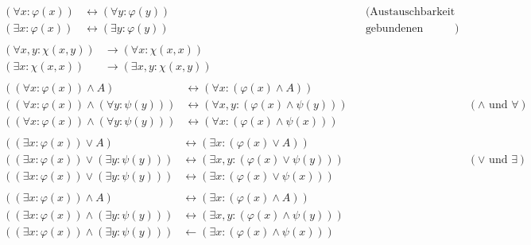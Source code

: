 \documentclass[12pt,BCOR1cm,ngerman,DIV15,fleqn,chapterprefix,headings=small]{ST1-book}
\begin{document}
   \begin{align*}
  \begin{split} (\forall x : \varphi(x)) & \leftrightarrow (\forall y : \varphi(y)) \\
  (\exists x : \varphi(x)) & \leftrightarrow (\exists y : \varphi(y)) \end{split} &  \begin{split}
  (\text{Austauschbarkeit der} \\
  \text{gebundenen Variable})
  \end{split}  \\[1em]
  \begin{split} (\forall x,y : \chi(x,y)) & \to (\forall x : \chi(x,x)) \\
    (\exists x : \chi(x,x)) & \to (\exists x, y: \chi(x,y)) \end{split} \\[1em]
      \begin{split} ((\forall x : \varphi(x)) \land A) & \leftrightarrow (\forall x :(\varphi(x) \land A)) \\
           ((\forall x : \varphi(x)) \land (\forall y : \psi(y))) & \leftrightarrow (\forall x,y : (\varphi(x) \land \psi(y)))\\
     ((\forall x : \varphi(x)) \land (\forall y : \psi(y))) & \leftrightarrow (\forall x : (\varphi(x) \land \psi(x))) 
     \end{split} && (\text{$\land$ und $\forall$}) \\[1em]
              \begin{split}
((\exists x : \varphi(x)) \lor A) & \leftrightarrow (\exists x : (\varphi(x) \lor A)) \\
      ((\exists x : \varphi(x)) \lor (\exists y : \psi(y))) & \leftrightarrow (\exists x,y : (\varphi(x) \lor \psi(y))) \\
      ((\exists x : \varphi(x)) \lor (\exists y : \psi(y))) & \leftrightarrow (\exists x : (\varphi(x) \lor \psi(x)))
      \end{split} && (\text{$\lor$ und $\exists$}) \\[1em]
          \begin{split}
((\exists x : \varphi(x)) \land A) & \leftrightarrow (\exists x : (\varphi(x) \land A)) \\
   ((\exists x : \varphi(x)) \land (\exists y : \psi(y))) & \leftrightarrow (\exists x,y:(\varphi(x)\land \psi(y))) \\
      ((\exists x : \varphi(x)) \land (\exists y : \psi(y))) & \leftarrow (\exists x : (\varphi(x) \land \psi(x)))

\end{split}
\end{align*}
\end{document}
